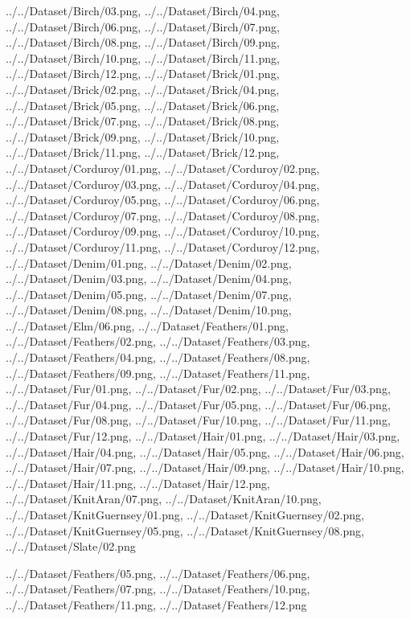 \documentclass[12pt,a4paper]{article}
\begin{document}
\begin{singlespace}
{../../Dataset/Birch/03.png,
../../Dataset/Birch/04.png,
../../Dataset/Birch/06.png,
../../Dataset/Birch/07.png,
../../Dataset/Birch/08.png,
../../Dataset/Birch/09.png,
../../Dataset/Birch/10.png,
../../Dataset/Birch/11.png,
../../Dataset/Birch/12.png,
../../Dataset/Brick/01.png,
../../Dataset/Brick/02.png,
../../Dataset/Brick/04.png,
../../Dataset/Brick/05.png,
../../Dataset/Brick/06.png,
../../Dataset/Brick/07.png,
../../Dataset/Brick/08.png,
../../Dataset/Brick/09.png,
../../Dataset/Brick/10.png,
../../Dataset/Brick/11.png,
../../Dataset/Brick/12.png,
../../Dataset/Corduroy/01.png,
../../Dataset/Corduroy/02.png,
../../Dataset/Corduroy/03.png,
../../Dataset/Corduroy/04.png,
../../Dataset/Corduroy/05.png,
../../Dataset/Corduroy/06.png,
../../Dataset/Corduroy/07.png,
../../Dataset/Corduroy/08.png,
../../Dataset/Corduroy/09.png,
../../Dataset/Corduroy/10.png,
../../Dataset/Corduroy/11.png,
../../Dataset/Corduroy/12.png,
../../Dataset/Denim/01.png,
../../Dataset/Denim/02.png,
../../Dataset/Denim/03.png,
../../Dataset/Denim/04.png,
../../Dataset/Denim/05.png,
../../Dataset/Denim/07.png,
../../Dataset/Denim/08.png,
../../Dataset/Denim/10.png,
../../Dataset/Elm/06.png,
../../Dataset/Feathers/01.png,
../../Dataset/Feathers/02.png,
../../Dataset/Feathers/03.png,
../../Dataset/Feathers/04.png,
../../Dataset/Feathers/08.png,
../../Dataset/Feathers/09.png,
../../Dataset/Feathers/11.png,
../../Dataset/Fur/01.png,
../../Dataset/Fur/02.png,
../../Dataset/Fur/03.png,
../../Dataset/Fur/04.png,
../../Dataset/Fur/05.png,
../../Dataset/Fur/06.png,
../../Dataset/Fur/08.png,
../../Dataset/Fur/10.png,
../../Dataset/Fur/11.png,
../../Dataset/Fur/12.png,
../../Dataset/Hair/01.png,
../../Dataset/Hair/03.png,
../../Dataset/Hair/04.png,
../../Dataset/Hair/05.png,
../../Dataset/Hair/06.png,
../../Dataset/Hair/07.png,
../../Dataset/Hair/09.png,
../../Dataset/Hair/10.png,
../../Dataset/Hair/11.png,
../../Dataset/Hair/12.png,
../../Dataset/KnitAran/07.png,
../../Dataset/KnitAran/10.png,
../../Dataset/KnitGuernsey/01.png,
../../Dataset/KnitGuernsey/02.png,
../../Dataset/KnitGuernsey/05.png,
../../Dataset/KnitGuernsey/08.png,
../../Dataset/Slate/02.png}

{../../Dataset/Feathers/05.png,
../../Dataset/Feathers/06.png,
../../Dataset/Feathers/07.png,
../../Dataset/Feathers/10.png,
../../Dataset/Feathers/11.png,
../../Dataset/Feathers/12.png}


\end{singlespace}
\end{document}
